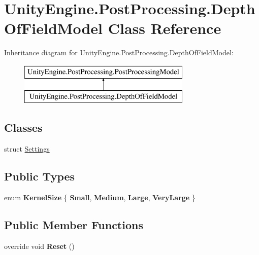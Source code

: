 \hypertarget{class_unity_engine_1_1_post_processing_1_1_depth_of_field_model}{}\section{Unity\+Engine.\+Post\+Processing.\+Depth\+Of\+Field\+Model Class Reference}
\label{class_unity_engine_1_1_post_processing_1_1_depth_of_field_model}
Inheritance diagram for Unity\+Engine.\+Post\+Processing.\+Depth\+Of\+Field\+Model\+:\begin{figure}[H]
\begin{center}
\leavevmode
\includegraphics[height=2.000000cm]{class_unity_engine_1_1_post_processing_1_1_depth_of_field_model}
\end{center}
\end{figure}
\subsection*{Classes}
\begin{DoxyCompactItemize}
\item 
struct \mbox{\hyperlink{struct_unity_engine_1_1_post_processing_1_1_depth_of_field_model_1_1_settings}{Settings}}
\end{DoxyCompactItemize}
\subsection*{Public Types}
\begin{DoxyCompactItemize}
\item 
\mbox{\label{class_unity_engine_1_1_post_processing_1_1_depth_of_field_model_a8b92e9c86b4ffe225306853f8bfd4015}} 
enum {\bfseries Kernel\+Size} \{ {\bfseries Small}, 
{\bfseries Medium}, 
{\bfseries Large}, 
{\bfseries Very\+Large}
 \}
\end{DoxyCompactItemize}
\subsection*{Public Member Functions}
\begin{DoxyCompactItemize}
\item 
\mbox{\label{class_unity_engine_1_1_post_processing_1_1_depth_of_field_model_aed85b9c87b7fd8c5844d44ff7883309c}} 
override void {\bfseries Reset} ()
\end{DoxyCompactItemize}

